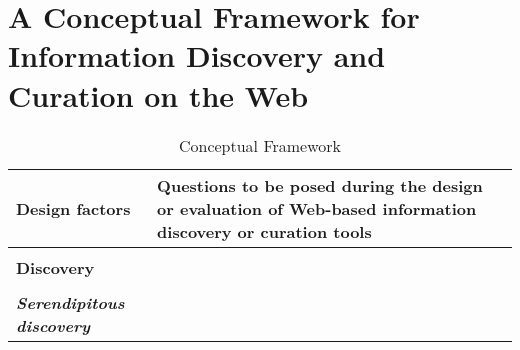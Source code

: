 {\section{A Conceptual Framework for Information Discovery and Curation on the Web}
\begin{table*}[htbp]
\caption{Conceptual Framework}
\centering
\small
\begin{tabular}{|p{0.28\linewidth}|p{0.72\linewidth}|}
\hline
\textbf{\large{Design factors}}   & \textbf{\large{Questions to be posed during the design or evaluation of Web-based information discovery or curation tools 
}}  \\
\hline
&\\
\textbf{\large{Discovery}}                     &                                                                                                           \\

&\\
\emph{\textbf{Serendipitous discovery}}     &                                                                                                           \\


\end{tabular}
\end{table*}}
